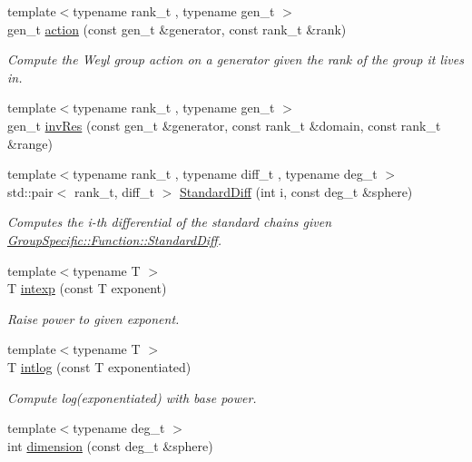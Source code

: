 \begin{DoxyCompactItemize}
\item 
{\footnotesize template$<$typename rank\+\_\+t , typename gen\+\_\+t $>$ }\\gen\+\_\+t \hyperlink{namespaceMackey_a3204eaf23b52b27392baaaf0a6898f76}{action} (const gen\+\_\+t \&generator, const rank\+\_\+t \&rank)
\begin{DoxyCompactList}\small\item\em Compute the Weyl group action on a generator given the rank of the group it lives in. \end{DoxyCompactList}\item 
{\footnotesize template$<$typename rank\+\_\+t , typename gen\+\_\+t $>$ }\\gen\+\_\+t \hyperlink{namespaceMackey_a30b5667e411ff694aa989e95e394bb41}{inv\+Res} (const gen\+\_\+t \&generator, const rank\+\_\+t \&domain, const rank\+\_\+t \&range)
\item 
{\footnotesize template$<$typename rank\+\_\+t , typename diff\+\_\+t , typename deg\+\_\+t $>$ }\\std\+::pair$<$ rank\+\_\+t, diff\+\_\+t $>$ \hyperlink{namespaceMackey_a4b31e1685ed5771bcced308b3b13c7f0}{Standard\+Diff} (int i, const deg\+\_\+t \&sphere)
\begin{DoxyCompactList}\small\item\em Computes the i-\/th differential of the standard chains given \hyperlink{classGroupSpecific_1_1Function_a8ead55e2f2e2bbda4deea3964793498d}{Group\+Specific\+::\+Function\+::\+Standard\+Diff}. \end{DoxyCompactList}\item 
{\footnotesize template$<$typename T $>$ }\\T \hyperlink{namespaceMackey_a4904fdc0fdcf3c23d7f3b80f59b2eafa}{intexp} (const T exponent)
\begin{DoxyCompactList}\small\item\em Raise power to given exponent. \end{DoxyCompactList}\item 
{\footnotesize template$<$typename T $>$ }\\T \hyperlink{namespaceMackey_aa0cac9097035c5fe8448742e22e6f78b}{intlog} (const T exponentiated)
\begin{DoxyCompactList}\small\item\em Compute log(exponentiated) with base power. \end{DoxyCompactList}\item 
{\footnotesize template$<$typename deg\+\_\+t $>$ }\\int \hyperlink{namespaceMackey_a6a5d40e69e5628ea84896ee43f4a91fa}{dimension} (const deg\+\_\+t \&sphere)

\end{DoxyCompactItemize}
